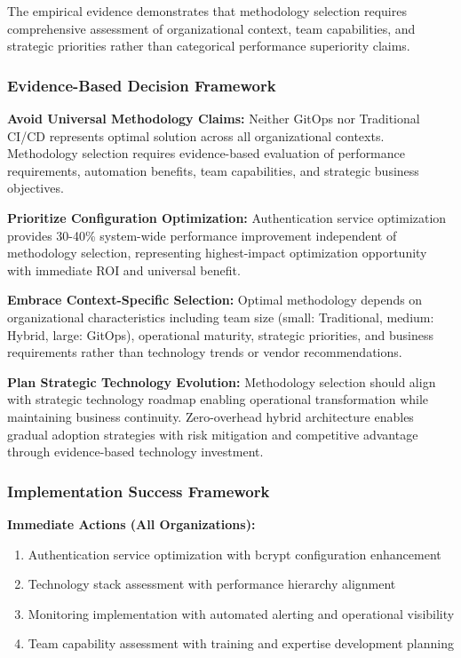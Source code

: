 The empirical evidence demonstrates that methodology selection requires comprehensive assessment of organizational context, team capabilities, and strategic priorities rather than categorical performance superiority claims.

\subsubsection{Evidence-Based Decision Framework}

\textbf{Avoid Universal Methodology Claims:}
Neither GitOps nor Traditional CI/CD represents optimal solution across all organizational contexts. Methodology selection requires evidence-based evaluation of performance requirements, automation benefits, team capabilities, and strategic business objectives.

\textbf{Prioritize Configuration Optimization:}
Authentication service optimization provides 30-40\% system-wide performance improvement independent of methodology selection, representing highest-impact optimization opportunity with immediate ROI and universal benefit.

\textbf{Embrace Context-Specific Selection:}
Optimal methodology depends on organizational characteristics including team size (small: Traditional, medium: Hybrid, large: GitOps), operational maturity, strategic priorities, and business requirements rather than technology trends or vendor recommendations.

\textbf{Plan Strategic Technology Evolution:}
Methodology selection should align with strategic technology roadmap enabling operational transformation while maintaining business continuity. Zero-overhead hybrid architecture enables gradual adoption strategies with risk mitigation and competitive advantage through evidence-based technology investment.

\subsubsection{Implementation Success Framework}

\textbf{Immediate Actions (All Organizations):}
\begin{enumerate}
\item Authentication service optimization with bcrypt configuration enhancement
\item Technology stack assessment with performance hierarchy alignment
\item Monitoring implementation with automated alerting and operational visibility
\item Team capability assessment with training and expertise development planning
\end{enumerate}

